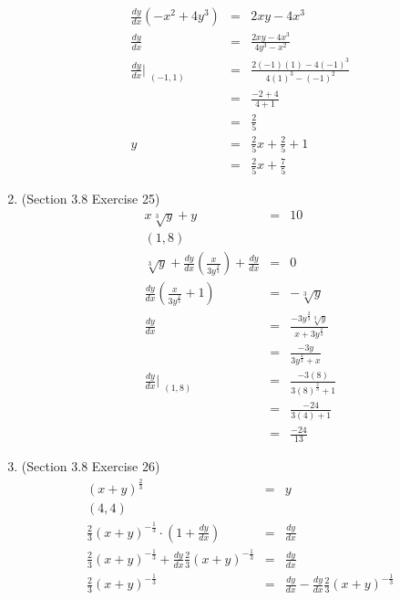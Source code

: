 \documentclass{article}
\begin{document}
\begin{enumerate}
\begin{eqnarray}
            \frac{dy}{dx}\left(-x^2 + 4y^3\right) &=& 2xy - 4x^3 \\
            \frac{dy}{dx} &=& \frac{2xy - 4x^3}{4y^3 - x^2} \\
            \frac{dy}{dx}\Bigr|_{\substack{(-1,1)}} &=& \frac{2(-1)(1) - 4(-1)^3}{4(1)^3 - (-1)^2} \\
                                                    &=& \frac{-2 + 4}{4 + 1} \\
                                                    &=& \frac{2}{5} \\
            y &=& \frac{2}{5}x + \frac{2}{5} + 1 \\
              &=& \frac{2}{5}x + \frac{7}{5}
        \end{eqnarray}
    \item (Section 3.8 Exercise 25)
        \begin{eqnarray}
            x\sqrt[3]{y} + y &=& 10 \\
            (1, 8) \\
            \sqrt[3]{y} + \frac{dy}{dx}\left(\frac{x}{3y^\frac{2}{3}}\right) + \frac{dy}{dx} &=& 0 \\
            \frac{dy}{dx}\left(\frac{x}{3y^\frac{2}{3}} + 1\right) &=& - \sqrt[3]{y} \\
            \frac{dy}{dx} &=& \frac{- 3y^\frac{2}{3}\sqrt[3]{y}}{x + 3y^{\frac{2}{3}}} \\
                          &=& \frac{- 3y}{3y^{\frac{2}{3}} + x} \\
            \frac{dy}{dx}\Bigr|_{\substack{(1,8)}} &=& \frac{- 3(8)}{3(8)^{\frac{2}{3}} + 1} \\
                                                   &=& \frac{-24}{3(4) + 1} \\
                                                   &=& \frac{-24}{13}
        \end{eqnarray}
    \item (Section 3.8 Exercise 26)
        \begin{eqnarray}
            \left(x + y\right)^{\frac{2}{3}} &=& y \\
            (4, 4) \\
            \frac{2}{3}\left(x + y\right)^{-\frac{1}{3}} \cdot \left(1 + \frac{dy}{dx}\right) &=& \frac{dy}{dx} \\
            \frac{2}{3}\left(x + y\right)^{-\frac{1}{3}} + \frac{dy}{dx}\frac{2}{3}\left(x + y\right)^{-\frac{1}{3}} &=& \frac{dy}{dx} \\
            \frac{2}{3}\left(x + y\right)^{-\frac{1}{3}} &=& \frac{dy}{dx} - \frac{dy}{dx}\frac{2}{3}\left(x + y\right)^{-\frac{1}{3}} \\

\end{eqnarray}
\end{enumerate}
\end{document}
